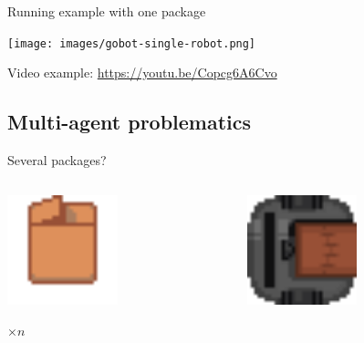 \begin{frame}{Running example with one package}
    \centering

    \texttt{[image: images/gobot-single-robot.png]}
    
    \Large
    Video example: \href{https://youtu.be/Copcg6A6Cvo}{https://youtu.be/Copcg6A6Cvo}
\end{frame}

\subsection{Multi-agent problematics}

\begin{frame}{Several packages?}
    \begin{columns}
        \begin{column}{0.5\textwidth}
            \centering
            \includegraphics[width = 0.5\textwidth]{images/godot/package.png}
            
            \Large $\times n$
        \end{column}
        \begin{column}{0.5\textwidth}
            \centering
            \includegraphics[width = 0.5\textwidth]{images/godot/robot_texture.png}
            

\end{column}
\end{columns}
\end{frame}
